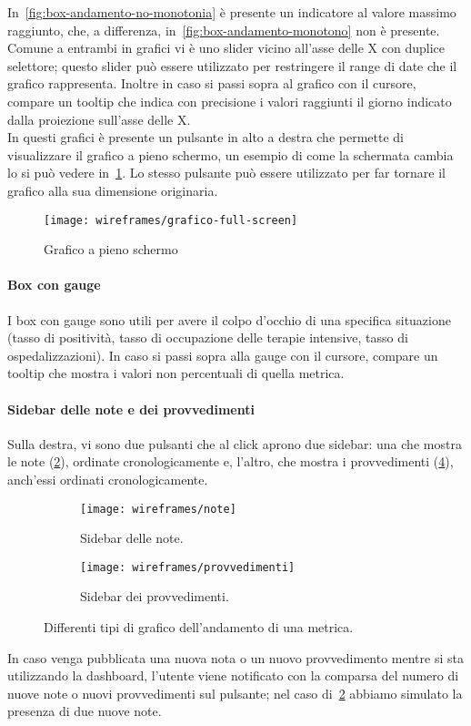 In~\ref{fig:box-andamento-no-monotonia} è presente un indicatore al valore massimo raggiunto, che, a differenza, in~\ref{fig:box-andamento-monotono} non è presente.\\
Comune a entrambi in grafici vi è uno slider vicino all'asse delle X con duplice selettore; questo slider può essere utilizzato per restringere il range di date che il grafico rappresenta. Inoltre in caso si passi sopra al grafico con il cursore, compare un tooltip che indica con precisione i valori raggiunti il giorno indicato dalla proiezione sull'asse delle X.\\
In questi grafici è presente un pulsante in alto a destra che permette di visualizzare il grafico a pieno schermo, un esempio di come la schermata cambia lo si può vedere in~\ref{fig:grafico-full-screen}. Lo stesso pulsante può essere utilizzato per far tornare il grafico alla sua dimensione originaria.
\begin{figure}[H]
    \centering
    \texttt{[image: wireframes/grafico-full-screen]}
    \caption{Grafico a pieno schermo}\label{fig:grafico-full-screen}
\end{figure}


\paragraph{Box con gauge}
I box con gauge sono utili per avere il colpo d'occhio di una specifica situazione (tasso di positività, tasso di occupazione delle terapie intensive, tasso di ospedalizzazioni). In caso si passi sopra alla gauge con il cursore, compare un tooltip che mostra i valori non percentuali di quella metrica.

\paragraph{Sidebar delle note e dei provvedimenti}
Sulla destra, vi sono due pulsanti che al click aprono due sidebar: una che mostra le note (\ref{fig:note}), ordinate cronologicamente e, l'altro, che mostra i provvedimenti (\ref{fig:provvedimenti}), anch'essi ordinati cronologicamente. 
\begin{figure}[H]
    \begin{subfigure}[b]{0.5\textwidth}
        \centering
        \texttt{[image: wireframes/note]}
        \caption{Sidebar delle note.}\label{fig:note}
    \end{subfigure}
\hfill
    \begin{subfigure}[b]{0.5\textwidth}
        \centering
        \texttt{[image: wireframes/provvedimenti]}
        \caption{Sidebar dei provvedimenti.}\label{fig:provvedimenti}
    \end{subfigure}
    \caption{Differenti tipi di grafico dell'andamento di una metrica.}
\end{figure}
In caso venga pubblicata una nuova nota o un nuovo provvedimento mentre si sta utilizzando la dashboard, l'utente viene notificato con la comparsa del numero di nuove note o nuovi provvedimenti sul pulsante; nel caso di~\ref{fig:note} abbiamo simulato la presenza di due nuove note.

